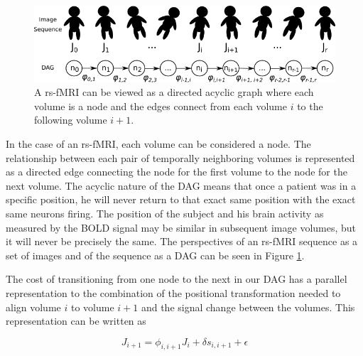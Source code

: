 \begin{figure}
\centering
\includegraphics[width=.7\textwidth]{4/dag-chain.png}
\caption{A rs-fMRI can be viewed as a directed acyclic graph where each volume is a node and the edges connect from each volume $i$ to the following volume $i+1$.}
\label{ch4:fig:dag-chain}
\end{figure}

In the case of an rs-fMRI, each volume can be considered a node. The relationship between each pair of temporally neighboring volumes is represented as a directed edge connecting the node for the first volume to the node for the next volume. The acyclic nature of the DAG means that once a patient was in a specific position, he will never return to that exact same position with the exact same neurons firing. The position of the subject and his brain activity as measured by the BOLD signal may be similar in subsequent image volumes, but it will never be precisely the same. The perspectives of an rs-fMRI sequence as a set of images and of the sequence as a DAG can be seen in Figure \ref{ch4:fig:dag-chain}.

The cost of transitioning from one node to the next in our DAG has a parallel representation to the combination of the positional transformation needed to align volume $i$ to volume $i+1$ and the signal change between the volumes. This representation can be written as 

\begin{equation}
J_{i+1} = \phi_{i,i+1} J_i + \delta s_{i,i+1} + \epsilon
\end{equation}


